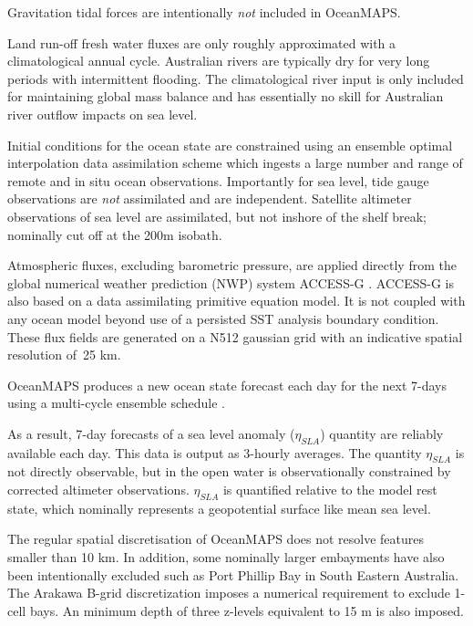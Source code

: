 Gravitation tidal forces are intentionally \textit{not} included in OceanMAPS.      


Land run-off fresh water fluxes are only roughly approximated with a climatological annual cycle. 
Australian rivers are typically dry for very long periods with intermittent flooding.   
The climatological river input is only included for maintaining global mass balance and has essentially no skill for Australian river outflow impacts on sea level.    


Initial conditions for the ocean state are constrained using an ensemble optimal interpolation data assimilation scheme \citep{Oke:2008wr} which ingests a large number and range of remote and in situ ocean observations. 
Importantly for sea level, tide gauge observations are \textit{not} assimilated and are independent.   
Satellite altimeter observations of sea level are assimilated, but not inshore of the shelf break; nominally cut off at the 200m isobath.


Atmospheric fluxes, excluding barometric pressure, are applied directly from the global numerical weather prediction (NWP) system ACCESS-G \citep{BureauofMeterology:C8IaJ2Qq}.
ACCESS-G is also based on a data assimilating primitive equation model.
It is not coupled with any ocean model beyond use of a persisted SST analysis boundary condition.
These flux fields are generated on a N512 gaussian grid with an indicative spatial resolution of~25 km. 

OceanMAPS produces a new ocean state forecast each day for the next 7-days using a multi-cycle ensemble schedule \citep{GaryBBrassington:2013jw}.

As a result, 7-day forecasts of a sea level anomaly ($\eta_{SLA}$) quantity are reliably available each day.  
This data is output as 3-hourly averages.  
The quantity $\eta_{SLA}$ is not directly observable, but in the open water is observationally constrained by corrected altimeter observations.
$\eta_{SLA}$ is quantified relative to the model rest state, which nominally represents a geopotential surface like mean sea level.  

The regular spatial discretisation of OceanMAPS does not resolve features smaller than 10 km.   
In addition, some nominally larger embayments have also been intentionally excluded such as Port Phillip Bay in South Eastern Australia.
The Arakawa B-grid discretization imposes a numerical requirement to exclude 1-cell bays. 
An minimum depth of three z-levels equivalent to 15 m is also imposed.

